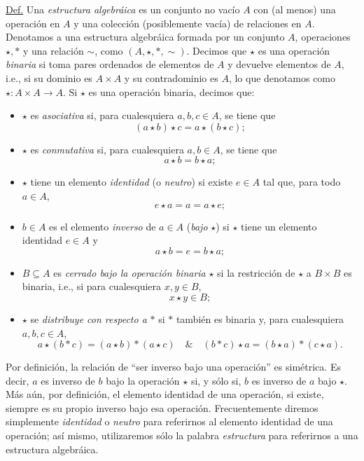 \documentclass[apuntes]{subfiles}
\begin{document}
\begin{tcolorbox}[breakable]
    \underline{Def.} Una \emph{estructura algebráica} es un conjunto no vacío $A$ con (al menos) una operación en $A$ y una colección (posiblemente vacía) de relaciones en $A$. Denotamos a una estructura algebráica formada por un conjunto $A$, operaciones $\star,\ast$ y una relación $\sim$, como $(A,\star,\ast,\sim)$. Decimos que $\star$ es una operación \emph{binaria} si toma pares ordenados de elementos de $A$ y devuelve elementos de $A$, i.e., si su dominio es $A\times A$ y su contradominio es $A$, lo que denotamos como $\star:A\times A\to A$. Si $\star$ es una operación binaria, decimos que:

    \begin{itemize}
        \item $\star$ es \emph{asociativa} si, para cualesquiera $a,b,c\in A$, se tiene que $$(a\star b)\star c = a\star(b\star c);$$

        \item $\star$ es \emph{conmutativa} si, para cualesquiera $a,b\in A$, se tiene que $$a\star b = b\star a;$$

        \item $\star$ tiene un elemento \emph{identidad} (o \emph{neutro}) si existe $e\in A$ tal que, para todo $a\in A$, $$e\star a = a = a\star e;$$

        \item $b\in A$ es el elemento \emph{inverso} de $a\in A$ (\emph{bajo} $\star$) si $\star$ tiene un elemento identidad $e\in A$ y $$a\star b = e = b\star a;$$

        \item $B\subseteq A$ es \emph{cerrado bajo la operación binaria} $\star$ si la restricción de $\star$ a $B\times B$ es binaria, i.e., si para cualesquiera $x,y\in B$, $$x\star y\in B;$$

        \item $\star$ se \emph{distribuye con respecto a} $\ast$ si $\ast$ también es binaria y, para cualesquiera $a,b,c\in A$, $$a\star(b\ast c) = (a\star b)\ast(a\star c) \quad \& \quad (b\ast c)\star a = (b\star a)\ast(c\star a).$$
    \end{itemize}
\end{tcolorbox}
    
\begin{obs}\label{obs:1.1}
    
Por definición, la relación de ``ser inverso bajo una operación'' es simétrica. Es decir, $a$ es inverso de $b$ bajo la operación $\star$ si, y sólo si, $b$ es inverso de $a$ bajo $\star$. Más aún, por definición, el elemento identidad de una operación, si existe, siempre es su propio inverso bajo esa operación. Frecuentemente diremos simplemente \emph{identidad} o \emph{neutro} para referirnos al elemento identidad de una operación; así mismo, utilizaremos sólo la palabra \emph{estructura} para referirnos a una estructura algebráica. 
\end{obs}
\end{document}
